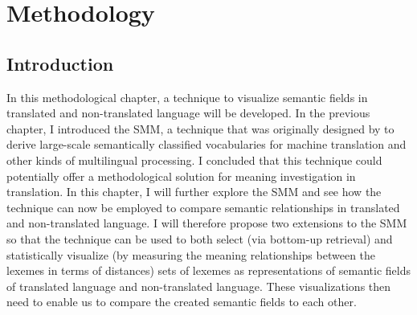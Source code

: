 \chapter{Methodology}
\label{sec:3}

\section{Introduction}
\label{sec:3.1}  
In this methodological chapter, a technique to visualize semantic fields in translated and non-translated language will be developed. In the previous chapter, I introduced the SMM, a technique that was originally designed by \citet{johansson_translational_1998,langemets_translations_2005} to derive large-scale semantically classified vocabularies for machine translation and other kinds of multilingual processing. I concluded that this technique could potentially offer a methodological solution for meaning investigation in translation. In this chapter, I will further explore the SMM and see how the technique can now be employed to compare semantic relationships in translated and non-translated language. I will therefore propose two extensions to the SMM so that the technique can be used to both select (via bottom-up retrieval) and statistically visualize (by measuring the meaning relationships between the lexemes in terms of distances) sets of lexemes as representations of semantic fields of translated language and non-translated language. These visualizations then need to enable us to compare the created semantic fields to each other.

